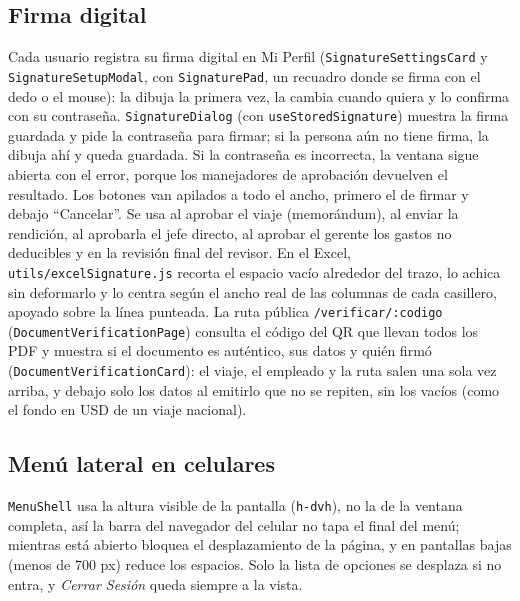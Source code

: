 \documentclass[11pt,letterpaper]{article}
\newcommand{\code}[1]{\nolinkurl{#1}}
\begin{document}
\subsection{Firma digital}
Cada usuario registra su firma digital en Mi Perfil (\code{SignatureSettingsCard} y \code{SignatureSetupModal}, con \code{SignaturePad}, un recuadro donde se firma con el dedo o el mouse): la dibuja la primera vez, la cambia cuando quiera y lo confirma con su contraseña. \code{SignatureDialog} (con \code{useStoredSignature}) muestra la firma guardada y pide la contraseña para firmar; si la persona aún no tiene firma, la dibuja ahí y queda guardada. Si la contraseña es incorrecta, la ventana sigue abierta con el error, porque los manejadores de aprobación devuelven el resultado. Los botones van apilados a todo el ancho, primero el de firmar y debajo ``Cancelar''. Se usa al aprobar el viaje (memorándum), al enviar la rendición, al aprobarla el jefe directo, al aprobar el gerente los gastos no deducibles y en la revisión final del revisor. En el Excel, \code{utils/excelSignature.js} recorta el espacio vacío alrededor del trazo, lo achica sin deformarlo y lo centra según el ancho real de las columnas de cada casillero, apoyado sobre la línea punteada. La ruta pública \code{/verificar/:codigo} (\code{DocumentVerificationPage}) consulta el código del QR que llevan todos los PDF y muestra si el documento es auténtico, sus datos y quién firmó (\code{DocumentVerificationCard}): el viaje, el empleado y la ruta salen una sola vez arriba, y debajo solo los datos al emitirlo que no se repiten, sin los vacíos (como el fondo en USD de un viaje nacional).

\subsection{Menú lateral en celulares}
\code{MenuShell} usa la altura visible de la pantalla (\code{h-dvh}), no la de la ventana completa, así la barra del navegador del celular no tapa el final del menú; mientras está abierto bloquea el desplazamiento de la página, y en pantallas bajas (menos de 700 px) reduce los espacios. Solo la lista de opciones se desplaza si no entra, y \emph{Cerrar Sesión} queda siempre a la vista.
\end{document}
